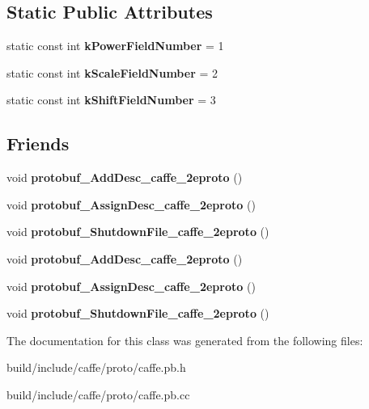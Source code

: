 \subsection*{Static Public Attributes}
\begin{DoxyCompactItemize}
\item 
\mbox{\label{classcaffe_1_1_power_parameter_af03907afd5990f354094cb345d330bdc}} 
static const int {\bfseries k\+Power\+Field\+Number} = 1
\item 
\mbox{\label{classcaffe_1_1_power_parameter_aee11b16e3f6790c07fd13220530f046e}} 
static const int {\bfseries k\+Scale\+Field\+Number} = 2
\item 
\mbox{\label{classcaffe_1_1_power_parameter_a82df777662a244135d5bce7fd2de0a04}} 
static const int {\bfseries k\+Shift\+Field\+Number} = 3
\end{DoxyCompactItemize}
\subsection*{Friends}
\begin{DoxyCompactItemize}
\item 
\mbox{\label{classcaffe_1_1_power_parameter_a2670a9c8ffd0e5105cf7522cd6f8613d}} 
void {\bfseries protobuf\+\_\+\+Add\+Desc\+\_\+caffe\+\_\+2eproto} ()
\item 
\mbox{\label{classcaffe_1_1_power_parameter_a7f145bddbdde78003d27e42c7e003d23}} 
void {\bfseries protobuf\+\_\+\+Assign\+Desc\+\_\+caffe\+\_\+2eproto} ()
\item 
\mbox{\label{classcaffe_1_1_power_parameter_a026784a8e4e76f1b4daf9d033d2ece83}} 
void {\bfseries protobuf\+\_\+\+Shutdown\+File\+\_\+caffe\+\_\+2eproto} ()
\item 
\mbox{\label{classcaffe_1_1_power_parameter_a2670a9c8ffd0e5105cf7522cd6f8613d}} 
void {\bfseries protobuf\+\_\+\+Add\+Desc\+\_\+caffe\+\_\+2eproto} ()
\item 
\mbox{\label{classcaffe_1_1_power_parameter_a7f145bddbdde78003d27e42c7e003d23}} 
void {\bfseries protobuf\+\_\+\+Assign\+Desc\+\_\+caffe\+\_\+2eproto} ()
\item 
\mbox{\label{classcaffe_1_1_power_parameter_a026784a8e4e76f1b4daf9d033d2ece83}} 
void {\bfseries protobuf\+\_\+\+Shutdown\+File\+\_\+caffe\+\_\+2eproto} ()
\end{DoxyCompactItemize}


The documentation for this class was generated from the following files\+:\begin{DoxyCompactItemize}
\item 
build/include/caffe/proto/caffe.\+pb.\+h\item 
build/include/caffe/proto/caffe.\+pb.\+cc\end{DoxyCompactItemize}
